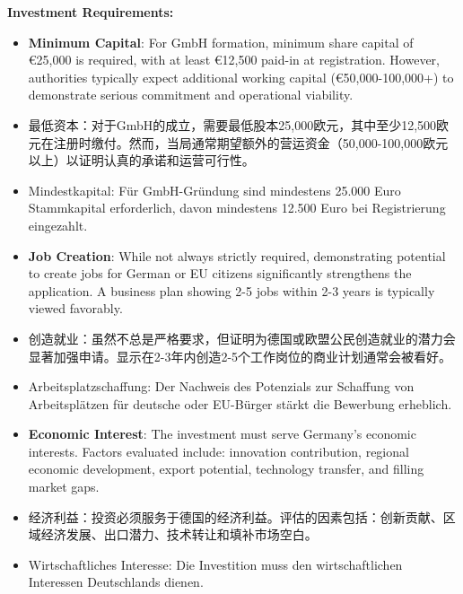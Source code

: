 \textbf{Investment Requirements:}
\begin{itemize}
    \item \textbf{Minimum Capital}: For GmbH formation, minimum share capital of €25,000 is required, with at least €12,500 paid-in at registration. However, authorities typically expect additional working capital (€50,000-100,000+) to demonstrate serious commitment and operational viability.
    \item 最低资本：对于GmbH的成立，需要最低股本25,000欧元，其中至少12,500欧元在注册时缴付。然而，当局通常期望额外的营运资金（50,000-100,000欧元以上）以证明认真的承诺和运营可行性。
    \item Mindestkapital: Für GmbH-Gründung sind mindestens 25.000 Euro Stammkapital erforderlich, davon mindestens 12.500 Euro bei Registrierung eingezahlt.
    
    \item \textbf{Job Creation}: While not always strictly required, demonstrating potential to create jobs for German or EU citizens significantly strengthens the application. A business plan showing 2-5 jobs within 2-3 years is typically viewed favorably.
    \item 创造就业：虽然不总是严格要求，但证明为德国或欧盟公民创造就业的潜力会显著加强申请。显示在2-3年内创造2-5个工作岗位的商业计划通常会被看好。
    \item Arbeitsplatzschaffung: Der Nachweis des Potenzials zur Schaffung von Arbeitsplätzen für deutsche oder EU-Bürger stärkt die Bewerbung erheblich.
    
    \item \textbf{Economic Interest}: The investment must serve Germany's economic interests. Factors evaluated include: innovation contribution, regional economic development, export potential, technology transfer, and filling market gaps.
    \item 经济利益：投资必须服务于德国的经济利益。评估的因素包括：创新贡献、区域经济发展、出口潜力、技术转让和填补市场空白。
    \item Wirtschaftliches Interesse: Die Investition muss den wirtschaftlichen Interessen Deutschlands dienen.
\end{itemize}


